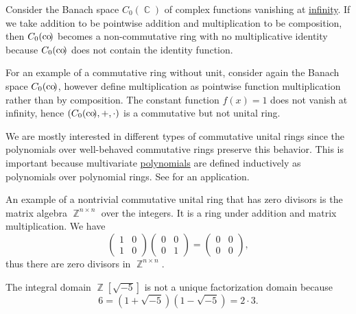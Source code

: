 \begin{example}
\begin{reflist}
     Consider the Banach space \( C_0(\BbbC) \) of complex functions vanishing at \hyperref[def:function_spaces/c0]{infinity}. If we take addition to be pointwise addition and multiplication to be composition, then \( C_0(\operatorname*{co\!)} \) becomes a non-commutative ring with no multiplicative identity because \( C_0(\operatorname*{co\!)} \) does not contain the identity function.

     For an example of a commutative ring without unit, consider again the Banach space \( C_0(\operatorname*{co\!)} \), however define multiplication as pointwise function multiplication rather than by composition. The constant function \( f(x) = 1 \) does not vanish at infinity, hence \( (C_0(\operatorname*{co\!)}, +, \cdot) \) is a commutative but not unital ring.

     We are mostly interested in different types of commutative unital rings since the polynomials over well-behaved commutative rings preserve this behavior. This is important because multivariate \hyperref[def:multivariate_polynomial]{polynomials} are defined inductively as polynomials over polynomial rings. See  for an application.

    An example of a nontrivial commutative unital ring that has zero divisors is the matrix algebra \( \BbbZ^{n \times n} \) over the integers. It is a ring under addition and matrix multiplication. We have
    \begin{equation*}
      \begin{pmatrix}
        1 & 0 \\
        1 & 0
      \end{pmatrix}
      \begin{pmatrix}
        0 & 0 \\
        0 & 1
      \end{pmatrix}
      =
      \begin{pmatrix}
        0 & 0 \\
        0 & 0
      \end{pmatrix},
    \end{equation*}
    thus there are zero divisors in \( \BbbZ^{n \times n} \).

    \cite[388]{Knapp2016BasicAlgebra} The integral domain \( \BbbZ[\sqrt{-5}] \) is not a unique factorization domain because
    \begin{equation*}
      6 = (1 + \sqrt{-5}) (1 - \sqrt{-5}) = 2 \cdot 3.
    \end{equation*}


\end{reflist}
\end{example}
